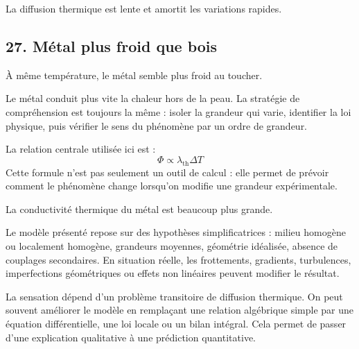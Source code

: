 \documentclass[11pt,a4paper]{article}
\begin{document}
\begin{corrigebox}[Indication]
La diffusion thermique est lente et amortit les variations rapides.
\end{corrigebox}


\subsection{27. Métal plus froid que bois}

\begin{exemplebox}
À même température, le métal semble plus froid au toucher.
\end{exemplebox}

\begin{methodebox}
Le métal conduit plus vite la chaleur hors de la peau.
La stratégie de compréhension est toujours la même : isoler la grandeur qui varie, identifier la loi physique, puis vérifier le sens du phénomène par un ordre de grandeur.
\end{methodebox}

\begin{theorembox}
La relation centrale utilisée ici est :
\[
\Phi \propto \lambda_{\mathrm{th}}\Delta T
\]
Cette formule n'est pas seulement un outil de calcul : elle permet de prévoir comment le phénomène change lorsqu'on modifie une grandeur expérimentale.
\end{theorembox}

\begin{odgbox}
La conductivité thermique du métal est beaucoup plus grande.
\end{odgbox}

\begin{attentionbox}
Le modèle présenté repose sur des hypothèses simplificatrices : milieu homogène ou localement homogène, grandeurs moyennes, géométrie idéalisée, absence de couplages secondaires. En situation réelle, les frottements, gradients, turbulences, imperfections géométriques ou effets non linéaires peuvent modifier le résultat.
\end{attentionbox}

\begin{approfondissementbox}
La sensation dépend d'un problème transitoire de diffusion thermique.
On peut souvent améliorer le modèle en remplaçant une relation algébrique simple par une équation différentielle, une loi locale ou un bilan intégral. Cela permet de passer d'une explication qualitative à une prédiction quantitative.
\end{approfondissementbox}
\end{document}

